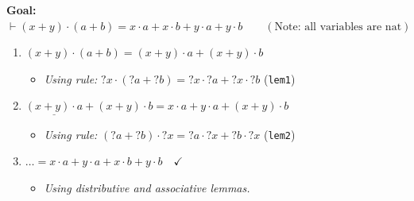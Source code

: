 \documentclass[10pt,a4paper]{article}
\begin{document}
\vspace{0.3em}

\begin{tcolorbox}[title=Worked Example: Distributivity on Nats]
\textbf{Goal:} $\vdash (x + y) \cdot (a + b) = x \cdot a + x \cdot b + y \cdot a + y \cdot b \qquad (\text{Note: all variables are } \text{nat})$

\begin{enumerate}[leftmargin=1.5em, itemsep=4pt]
    \item $(x + y) \cdot (a + b) = (x + y) \cdot a + (x + y) \cdot b$
    \begin{itemize}[leftmargin=1em, label=$\rightarrow$]
        \item \textit{Using rule:} $?x \cdot (?a + ?b) = ?x \cdot ?a + ?x \cdot ?b$ \quad (\texttt{lem1})
    \end{itemize}
    
    \item $\underline{(x + y) \cdot a} + (x + y) \cdot b = x \cdot a + y \cdot a + (x + y) \cdot b$
    \begin{itemize}[leftmargin=1em, label=$\rightarrow$]
        \item \textit{Using rule:} $(?a + ?b) \cdot ?x = ?a \cdot ?x + ?b \cdot ?x$ \quad (\texttt{lem2})
    \end{itemize}
    
    \item $\dots = x \cdot a + y \cdot a + x \cdot b + y \cdot b \quad \checkmark$
    \begin{itemize}[leftmargin=1em, label=$\rightarrow$]
        \item \textit{Using distributive and associative lemmas.}
    \end{itemize}
\end{enumerate}
\end{tcolorbox}

\vspace{0.3em}
\end{document}
